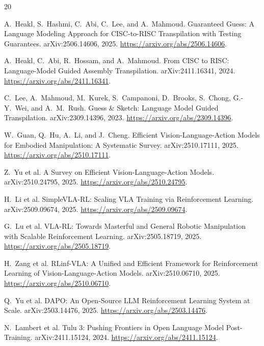 \documentclass{article}
\begin{document}
\small
\begin{thebibliography}{20}

A.~Heakl, S.~Hashmi, C.~Abi, C.~Lee, and A.~Mahmoud.
\newblock Guaranteed Guess: A Language Modeling Approach for CISC-to-RISC Transpilation with Testing Guarantees.
\newblock arXiv:2506.14606, 2025.
\newblock \url{https://arxiv.org/abs/2506.14606}.

A.~Heakl, C.~Abi, R.~Hossam, and A.~Mahmoud.
\newblock From CISC to RISC: Language-Model Guided Assembly Transpilation.
\newblock arXiv:2411.16341, 2024.
\newblock \url{https://arxiv.org/abs/2411.16341}.

C.~Lee, A.~Mahmoud, M.~Kurek, S.~Campanoni, D.~Brooks, S.~Chong, G.-Y.~Wei, and A.~M.~Rush.
\newblock Guess \& Sketch: Language Model Guided Transpilation.
\newblock arXiv:2309.14396, 2023.
\newblock \url{https://arxiv.org/abs/2309.14396}.

W.~Guan, Q.~Hu, A.~Li, and J.~Cheng.
\newblock Efficient Vision-Language-Action Models for Embodied Manipulation: A Systematic Survey.
\newblock arXiv:2510.17111, 2025.
\newblock \url{https://arxiv.org/abs/2510.17111}.

Z.~Yu et al.
\newblock A Survey on Efficient Vision-Language-Action Models.
\newblock arXiv:2510.24795, 2025.
\newblock \url{https://arxiv.org/abs/2510.24795}.

H.~Li et al.
\newblock SimpleVLA-RL: Scaling VLA Training via Reinforcement Learning.
\newblock arXiv:2509.09674, 2025.
\newblock \url{https://arxiv.org/abs/2509.09674}.

G.~Lu et al.
\newblock VLA-RL: Towards Masterful and General Robotic Manipulation with Scalable Reinforcement Learning.
\newblock arXiv:2505.18719, 2025.
\newblock \url{https://arxiv.org/abs/2505.18719}.

H.~Zang et al.
\newblock RLinf-VLA: A Unified and Efficient Framework for Reinforcement Learning of Vision-Language-Action Models.
\newblock arXiv:2510.06710, 2025.
\newblock \url{https://arxiv.org/abs/2510.06710}.

Q.~Yu et al.
\newblock DAPO: An Open-Source LLM Reinforcement Learning System at Scale.
\newblock arXiv:2503.14476, 2025.
\newblock \url{https://arxiv.org/abs/2503.14476}.

N.~Lambert et al.
\newblock Tulu 3: Pushing Frontiers in Open Language Model Post-Training.
\newblock arXiv:2411.15124, 2024.
\newblock \url{https://arxiv.org/abs/2411.15124}.


\end{thebibliography}
\end{document}
